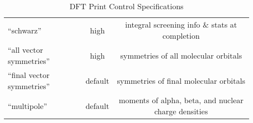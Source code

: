 \begin{table}[htbp]
\begin{center}
\begin{tabular}{lcc}
 ``schwarz''                        & high        & integral screening info \& stats at completion\\
 ``all vector symmetries''          & high        & symmetries of all molecular orbitals \\
 ``final vector symmetries''        & default     & symmetries of final molecular orbitals \\
 ``multipole''                      & default     & moments of alpha, beta, and nuclear charge densities \\
\end{tabular}
\end{center}
\caption{DFT Print Control Specifications}
\end{table}




